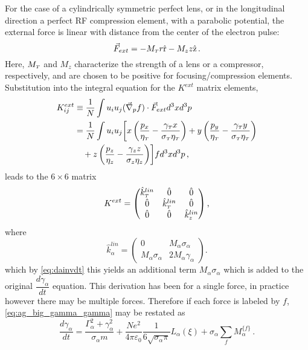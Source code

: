For the case of a cylindrically symmetric perfect lens, or in the longitudinal direction a perfect RF compression element, with a parabolic potential, the external force is linear with distance from the center of the electron pulse: 
\begin{equation} \label{eq:linear_force}
\vec{F}_{ext} = - M_{ {\scriptscriptstyle T} } r \hat{\operatorname{r}} - M_{z} z \hat{\operatorname{z}} \,\text{.}
\end{equation}
Here, $M_{ {\scriptscriptstyle T} }$ and $M_{z}$ characterize the strength of a lens or a compressor, respectively, and are chosen to be positive for focusing/compression elements.
Substitution into the integral equation for the $ K^{ext} $ matrix elements,
\begin{equation}
  \begin{split} 
    K^{ext}_{ij} & \equiv \dfrac{1} {N} \int u_{i} u_{j} ( \vec{\nabla}_{p} f ) \cdot \vec{F}_{ext} d^{3} x d^{3} p \\ 
    & = \dfrac{1} {N} \int u_{i} u_{j} \biggl[ x \left( \dfrac{ p_{x} } { \eta_{ {\scriptscriptstyle T} } } - \dfrac{ \gamma_{ {\scriptscriptstyle T} } x } { \sigma_{ {\scriptscriptstyle T} } \eta_{ {\scriptscriptstyle T} } } \right) + y \left( \dfrac{ p_{y} } { \eta_{ {\scriptscriptstyle T} } } - \dfrac{ \gamma_{ {\scriptscriptstyle T} } y } { \sigma_{ {\scriptscriptstyle T} } \eta_{ {\scriptscriptstyle T} } } \right) \\
    & \quad + z \left( \dfrac{ p_{z} } { \eta_{z} } - \dfrac{ \gamma_{z} z } { \sigma_{z} \eta_{z} } \right) \biggr] f d^{3} x d^{3} p \,\text{,}
  \end{split}
\end{equation}
leads to the $6\times6$ matrix
\begin{equation}
  K^{ext} = 
  \begin{pmatrix}
    \hat{k}^{lin}_{{\scriptscriptstyle T}} & \hat{0} & \hat{0} \\
    \hat{0} & \hat{k}^{lin}_{{\scriptscriptstyle T}} & \hat{0} \\
    \hat{0} & \hat{0} & \hat{k}^{lin}_{z}
  \end{pmatrix} \text{,}
\end{equation}
where
\begin{equation}
  \hat{k}^{lin}_{\alpha} =
  \begin{pmatrix}
    0 & M_{\alpha} \sigma_{\alpha} \\
    M_{\alpha} \sigma_{\alpha} & 2 M_{\alpha} \gamma_{\alpha}
  \end{pmatrix} \text{.}
\end{equation}
which by \ref{eq:dainvdt} this yields an additional term $M_{\alpha} \sigma_{\alpha}$ which is added to the original $\dfrac{d \gamma_{\alpha}}{d t}$ equation.
This derivation has been for a single force, in practice however there may be multiple forces.
Therefore if each force is labeled by $f$, \ref{eq:ag_big_gamma_gamma} may be restated as
\begin{equation}
  \frac{d\gamma_{\alpha}}{dt} = \frac{ \Gamma_{\alpha}^2 + \gamma_{\alpha}^2 }{\sigma_{\alpha} m}
    + \frac{N e^2}{4\pi\varepsilon_0} \frac{1}{6 \sqrt{\sigma_{\alpha}\pi}} L_{\alpha}(\xi) + \sigma_{\alpha} \sum\limits_{f} M_{\alpha}^{\lbrace f \rbrace} \,\text{.}
\end{equation}

